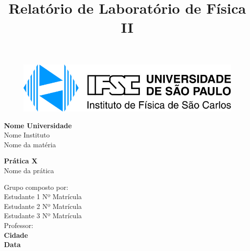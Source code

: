 \documentclass[a4paper]{article}
\begin{document}
\title{Relatório de Laboratório de Física II}

\begin{titlepage}
	\begin{center}
		\begin{figure}[htb!]
		\centering
				\includegraphics[scale=1.5]{imagens/logo.jpg}
		\end{figure}
		\vspace{20pt}
        \Large{\textbf{Nome Universidade }}\\
        \Large{Nome Instituto}\\
        \Large{Nome da matéria}\\
        
        \vspace{150pt}
        
        \LARGE{\textbf{Prática X}}\\ %
        \Large{Nome da prática}\\ %
        
        \vspace{125pt}
        
        \hfill Grupo composto por: \\%
        
        \vspace{20pt} %
        \hfill Estudante 1 \hspace{20pt}Nº Matrícula\\
        \hfill Estudante 2 \hspace{20pt}Nº Matrícula\\
        \hfill Estudante 3 \hspace{20pt}Nº Matrícula\\

        \vspace{25pt}
        \hfill {Professor:}\\
        
        
        \vspace{\fill}
        \Large \bf{Cidade\\}
        \Large \bf{Data}
          
	\end{center}
\end{titlepage}
\end{document}

